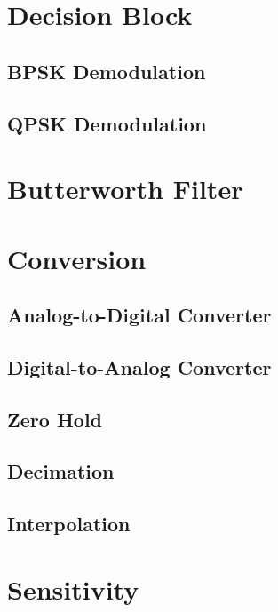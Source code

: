 \documentclass[]{article}
\begin{document}
\section{Decision Block}
\label{app:dblocks}
\subsection{BPSK Demodulation}
\label{app:bpsk_demod}


\subsection{QPSK Demodulation}
\label{app:qpsk_demod}


\section{Butterworth Filter}
\label{app:butterworth}


\section{Conversion}
\label{app:convert}
\subsection{Analog-to-Digital Converter}
\label{app:ad}

\subsection{Digital-to-Analog Converter}
\label{app:da}


\subsection{Zero Hold}
\label{app:zero}
\subsection{Decimation}

\subsection{Interpolation}


\section{Sensitivity}
\label{app:sensitivity}
\end{document}

